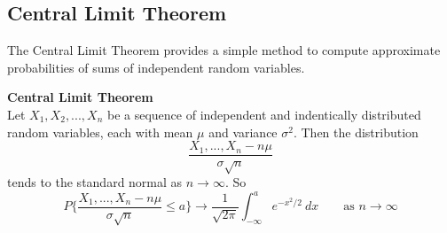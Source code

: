 \documentclass[10pt,a4paper]{article}
\begin{document}
\subsection{Central Limit Theorem}
The Central Limit Theorem provides a simple method to compute approximate probabilities of sums of independent random variables.
\begin{framed}
	\centering\textbf{Central Limit Theorem} \\
	Let $X_{1}, X_{2}, ..., X_{n}$ be a sequence of independent and indentically distributed random variables, each with mean $\mu$ and variance $\sigma^{2}$. Then the distribution $$\frac{X_{1}, ..., X_{n} - n\mu}{\sigma\sqrt{n}}$$ tends to the standard normal as $n \to \infty$. So $$P\bigg\{\frac{X_{1}, ..., X_{n} - n\mu}{\sigma\sqrt{n}} \leq a\bigg\} \to \frac{1}{\sqrt{2\pi}}\int_{-\infty}^{a}e^{-x^{2}/2}\ dx \qquad \text{as } n\to\infty$$
\end{framed}
\newpage 
\end{document}
